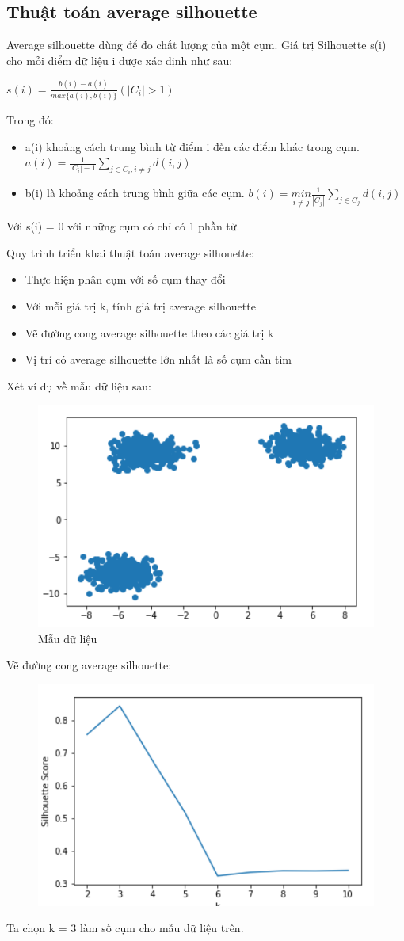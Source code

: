 \subsection{Thuật toán average silhouette}
Average silhouette dùng để đo chất lượng của một cụm. Giá trị Silhouette s(i) cho mỗi điểm dữ liệu i được xác định như sau:\\
\begin{center}
	\large
	$s(i) = \frac{b(i) - a(i)}{max\{a(i), b(i)\}} (|C_i| > 1)$
\end{center}\par
Trong đó:
\begin{itemize}
	\item a(i) khoảng cách trung bình từ điểm i đến các điểm khác trong cụm. $a(i) = \frac{1}{|C_i| - 1}\sum\limits_{j \in C_i, i \neq j}{d(i, j)}$
	\item b(i) là khoảng cách trung bình giữa các cụm. $b(i) = \underset{i \neq j}{min} \frac{1}{|C_j|}\sum\limits_{j \in C_j}{d(i, j)}$
\end{itemize}
Với s(i) = 0 với những cụm có chỉ có 1 phần tử.\par
\smallskip
Quy trình triển khai thuật toán average silhouette:
\begin{itemize}
	\item Thực hiện phân cụm với số cụm thay đổi
	\item Với mỗi giá trị k, tính giá trị average silhouette
	\item Vẽ đường cong average silhouette theo các giá trị k
	\item Vị trí có average silhouette lớn nhất là số cụm cần tìm
\end{itemize}
Xét ví dụ về mẫu dữ liệu sau:
\begin{figure}[h]
	\centering
	\includegraphics[width=0.5\linewidth]{img/data_set_3}
	\caption{Mẫu dữ liệu}
\end{figure}\par
Vẽ đường cong average silhouette:
\begin{figure}[h]
	\centering
	\includegraphics[width=0.5\linewidth]{img/data_set_4}
\end{figure}\par
Ta chọn k = 3 làm số cụm cho mẫu dữ liệu trên.